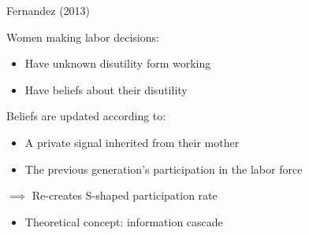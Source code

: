 \documentclass[compress, 8pt]{beamer}
\begin{document}
\begin{frame}{Fernandez (2013)}

Women making labor decisions:
\begin{itemize}
    \item Have unknown disutility form working
    \item Have beliefs about their disutility
\end{itemize}

\vspace{3ex}
Beliefs are updated according to:
\begin{itemize}
     \item A private signal inherited from their mother
     \item The previous generation's participation in the labor force
 \end{itemize} 

\vspace{3ex}
$\implies$ Re-creates S-shaped participation rate
\begin{itemize}
    \item Theoretical concept: information cascade
\end{itemize}
\end{frame}




\end{document}
